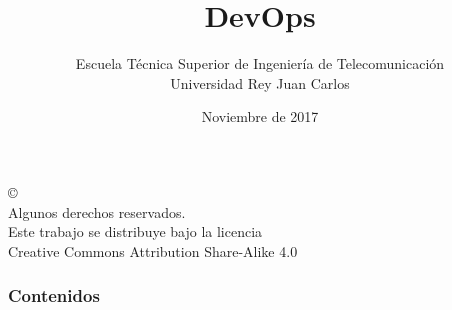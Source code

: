 \documentclass[ucs]{beamer}
\begin{document}
\title[DevOps]{DevOps}

\author[GSyC]{Escuela Técnica Superior de Ingeniería de Telecomunicación\\
Universidad Rey Juan Carlos}
\date[2017]{Noviembre de 2017}



\begin{frame}
  \titlepage
\end{frame}



\begin{frame}[b]
\begin{flushright}
{\tiny
\copyright \insertshortdate~\insertshortauthor \\
  Algunos derechos reservados. \\
  Este trabajo se distribuye bajo la licencia \\
  Creative Commons Attribution Share-Alike 4.0\\
}
\end{flushright}  
\end{frame}



\begin{frame}
  \frametitle{Contenidos}

  \tableofcontents

\end{frame}
\end{document}
